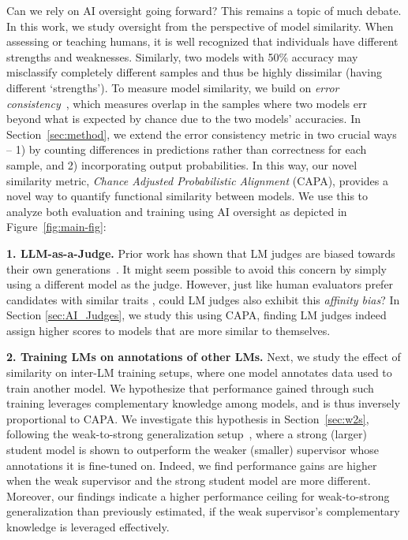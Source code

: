 Can we rely on AI oversight going forward? This remains a topic of much debate. In this work, we study oversight from the perspective of model similarity. When assessing or teaching humans, it is well recognized that individuals have different strengths and weaknesses. Similarly, two models with 50\% accuracy may misclassify completely different samples and thus be highly dissimilar (having different `strengths'). To measure model similarity, we build on \textit{error consistency}~\citep{geirhos2020beyond}, which measures overlap in the samples where two models err beyond what is expected by chance due to the two models' accuracies. In Section~\ref{sec:method}, we extend the error consistency metric in two crucial ways -- 1) by counting differences in predictions rather than correctness for each sample, and 2) incorporating output probabilities. In this way, our novel similarity metric, \textit{Chance Adjusted Probabilistic Alignment} (CAPA), provides a novel way to quantify functional similarity between models. We use this to analyze both evaluation and training using AI oversight as depicted in Figure~\ref{fig:main-fig}:

\textbf{1. LLM-as-a-Judge.} Prior work has shown that LM judges are biased towards their own generations~\citep{liu-etal-2024-llms-narcissistic, panickssery2024llm}. It might seem possible to avoid this concern by simply using a different model as the judge. However, just like human evaluators prefer candidates with similar traits \citep{bagues2012recruiters}, could LM judges also exhibit this \textit{affinity bias}? In Section \ref{sec:AI_Judges}, we study this using CAPA, finding LM judges indeed assign higher scores to models that are more similar to themselves.

\textbf{2. Training LMs on annotations of other LMs.} Next, we study the effect of similarity on inter-LM training set\-ups, where one model annotates data used to train another model. We hypothesize that performance gained through such training leverages complementary knowledge among models, and is thus inversely proportional to CAPA. We investigate this hypothesis in Section~\ref{sec:w2s}, following the weak-to-strong generalization setup~\citep{burns2024weaktostrong}, where a strong (larger) student model is shown to outperform the weaker (smaller) supervisor whose annotations it is fine-tuned on. Indeed, we find performance gains are higher when the weak supervisor and the strong student model are more different. Moreover, our findings indicate a higher performance ceiling for weak-to-strong generalization than previously estimated, if the weak supervisor's complementary knowledge is leveraged effectively.

